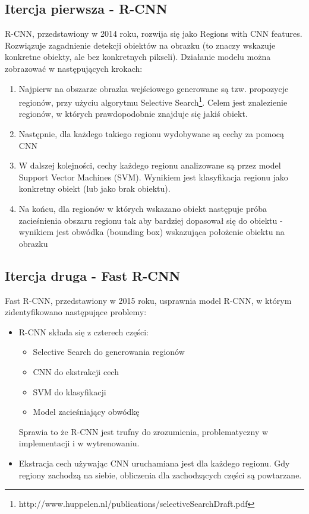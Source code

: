 \subsection{Itercja pierwsza - R-CNN}

R-CNN, przedstawiony w 2014 roku, rozwija się jako Regions with CNN features. Rozwiązuje zagadnienie detekcji obiektów na obrazku (to znaczy wskazuje konkretne obiekty, ale bez konkretnych pikseli). Działanie modelu można zobrazować w następujących krokach:

\begin{enumerate}
	\item Najpierw na obszarze obrazka wejściowego generowane są tzw. propozycje regionów, przy użyciu algorytmu Selective Search\footnote{http://www.huppelen.nl/publications/selectiveSearchDraft.pdf}. Celem jest znalezienie regionów, w których prawdopodobnie znajduje się jakiś obiekt.
	\item Następnie, dla każdego takiego regionu wydobywane są cechy za pomocą CNN
	\item W dalszej kolejności, cechy każdego regionu analizowane są przez model Support Vector Machines (SVM). Wynikiem jest klasyfikacja regionu jako konkretny obiekt (lub jako brak obiektu).
	\item Na końcu, dla regionów w których wskazano obiekt następuje próba zacieśnienia obszaru regionu tak aby bardziej dopasował się do obiektu - wynikiem jest obwódka (bounding box) wskazująca położenie obiektu na obrazku
\end{enumerate}

\subsection{Itercja druga - Fast R-CNN}

Fast R-CNN, przedstawiony w 2015 roku, usprawnia model R-CNN, w którym zidentyfikowano następujące problemy:

\begin{itemize}
	\item R-CNN składa się z czterech części:
		\begin{itemize}
			\item Selective Search do generowania regionów
			\item CNN do ekstrakcji cech
			\item SVM do klasyfikacji
			\item Model zacieśniający obwódkę
		\end{itemize}
		Sprawia to że R-CNN jest trufny do zrozumienia, problematyczny w implementacji i w wytrenowaniu.
	\item Ekstracja cech używając CNN uruchamiana jest dla każdego regionu. Gdy regiony zachodzą na siebie, obliczenia dla zachodzących części są powtarzane.
\end{itemize}

